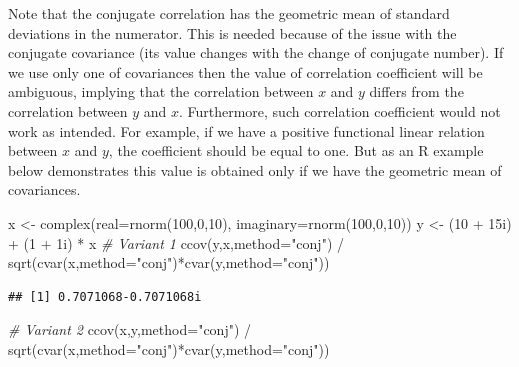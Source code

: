 \documentclass[
]{book}
\newenvironment{Shaded}{\begin{snugshade}}{\end{snugshade}}
\newcommand{\AttributeTok}[1]{\textcolor[rgb]{0.77,0.63,0.00}{#1}}
\newcommand{\CommentTok}[1]{\textcolor[rgb]{0.56,0.35,0.01}{\textit{#1}}}
\newcommand{\DecValTok}[1]{\textcolor[rgb]{0.00,0.00,0.81}{#1}}
\newcommand{\FunctionTok}[1]{\textcolor[rgb]{0.00,0.00,0.00}{#1}}
\newcommand{\NormalTok}[1]{#1}
\newcommand{\OtherTok}[1]{\textcolor[rgb]{0.56,0.35,0.01}{#1}}
\newcommand{\SpecialCharTok}[1]{\textcolor[rgb]{0.00,0.00,0.00}{#1}}
\newcommand{\StringTok}[1]{\textcolor[rgb]{0.31,0.60,0.02}{#1}}
\begin{document}
Note that the conjugate correlation has the geometric mean of standard deviations in the numerator. This is needed because of the issue with the conjugate covariance (its value changes with the change of conjugate number). If we use only one of covariances \citep[as done, for example, by][]{Panchev1971} then the value of correlation coefficient will be ambiguous, implying that the correlation between \(x\) and \(y\) differs from the correlation between \(y\) and \(x\). Furthermore, such correlation coefficient would not work as intended. For example, if we have a positive functional linear relation between \(x\) and \(y\), the coefficient should be equal to one. But as an R example below demonstrates this value is obtained only if we have the geometric mean of covariances.

\begin{Shaded}
\begin{Highlighting}[]
\NormalTok{x }\OtherTok{\textless{}{-}} \FunctionTok{complex}\NormalTok{(}\AttributeTok{real=}\FunctionTok{rnorm}\NormalTok{(}\DecValTok{100}\NormalTok{,}\DecValTok{0}\NormalTok{,}\DecValTok{10}\NormalTok{), }\AttributeTok{imaginary=}\FunctionTok{rnorm}\NormalTok{(}\DecValTok{100}\NormalTok{,}\DecValTok{0}\NormalTok{,}\DecValTok{10}\NormalTok{))}
\NormalTok{y }\OtherTok{\textless{}{-}}\NormalTok{ (}\DecValTok{10} \SpecialCharTok{+}\NormalTok{ 15i) }\SpecialCharTok{+}\NormalTok{ (}\DecValTok{1} \SpecialCharTok{+}\NormalTok{ 1i) }\SpecialCharTok{*}\NormalTok{ x}
\CommentTok{\# Variant 1}
\FunctionTok{ccov}\NormalTok{(y,x,}\AttributeTok{method=}\StringTok{"conj"}\NormalTok{) }\SpecialCharTok{/}
    \FunctionTok{sqrt}\NormalTok{(}\FunctionTok{cvar}\NormalTok{(x,}\AttributeTok{method=}\StringTok{"conj"}\NormalTok{)}\SpecialCharTok{*}\FunctionTok{cvar}\NormalTok{(y,}\AttributeTok{method=}\StringTok{"conj"}\NormalTok{))}
\end{Highlighting}
\end{Shaded}

\begin{verbatim}
## [1] 0.7071068-0.7071068i
\end{verbatim}

\begin{Shaded}
\begin{Highlighting}[]
\CommentTok{\# Variant 2}
\FunctionTok{ccov}\NormalTok{(x,y,}\AttributeTok{method=}\StringTok{"conj"}\NormalTok{) }\SpecialCharTok{/}
    \FunctionTok{sqrt}\NormalTok{(}\FunctionTok{cvar}\NormalTok{(x,}\AttributeTok{method=}\StringTok{"conj"}\NormalTok{)}\SpecialCharTok{*}\FunctionTok{cvar}\NormalTok{(y,}\AttributeTok{method=}\StringTok{"conj"}\NormalTok{))}
\end{Highlighting}
\end{Shaded}
\end{document}
